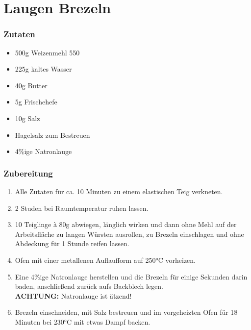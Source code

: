 \documentclass{scrreport}
\begin{document}
\renewcommand{\contentsname}{Inhaltsverzeichnis}
\setcounter{tocdepth}{1}
\tableofcontents
{}
\pagebreak
{}

\chapter{Laugen Brezeln}

\subsection*{Zutaten}

\begin{itemize}
	\item 500g Weizenmehl 550
	\item 225g kaltes Wasser
	\item 40g Butter
	\item 5g Frischehefe
	\item 10g Salz
	\item Hagelsalz zum Bestreuen
	\item 4\%ige Natronlauge
\end{itemize}

\subsection*{Zubereitung}

\begin{enumerate}
	\item Alle Zutaten für ca. 10 Minuten zu einem elastischen Teig verkneten.
	\item 2 Studen bei Raumtemperatur ruhen lassen.
	\item 10 Teiglinge à 80g abwiegen, länglich wirken und dann ohne Mehl auf der Arbeitsfläche zu langen
	      Würsten ausrollen, zu Brezeln einschlagen und ohne Abdeckung für 1 Stunde reifen lassen.
	\item Ofen mit einer metallenen Auflaufform auf 250°C vorheizen.
	\item Eine 4\%ige Natronlauge herstellen und die Brezeln für einige Sekunden darin baden, anschließend
	      zurück aufs Backblech legen. \\\textbf{ACHTUNG:} Natronlauge ist ätzend!
	\item Brezeln einschneiden, mit Salz bestreuen und im vorgeheizten Ofen für 18 Minuten bei 230°C mit etwas
	      Dampf backen.
\end{enumerate}
\end{document}
